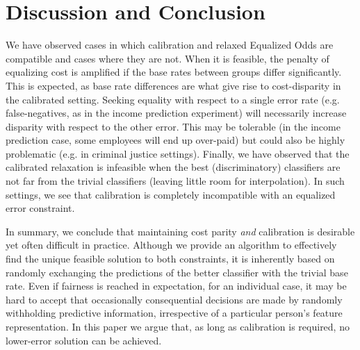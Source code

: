 \section{Discussion and Conclusion}

  We have observed cases in which calibration and relaxed Equalized Odds
  are compatible and cases where they
  are not. When it is feasible, the penalty of equalizing cost is amplified if
  the base rates between groups differ significantly. This is expected,
  as base rate differences are what give rise to cost-disparity in the calibrated setting.
  Seeking equality with respect to a single error rate (e.g. false-negatives, as in the income
  prediction experiment) will necessarily increase disparity with respect to the
  other error. This may be tolerable (in the income prediction case, some
  employees will end up over-paid) but could also be highly problematic (e.g.
  in criminal justice settings).
%
%
  Finally, we have observed that the calibrated relaxation is infeasible when the best (discriminatory)
  classifiers are not far from the trivial classifiers (leaving little room for interpolation). In such settings,
  we see that calibration is completely incompatible with an equalized error
  constraint.

In summary, we conclude that maintaining cost parity \emph{and} calibration is
desirable yet often difficult in practice. Although we provide an algorithm to
effectively find the unique feasible solution to both constraints, it is
inherently based on randomly exchanging the predictions of the better
classifier with the trivial base rate. Even if fairness is reached in
expectation, for an individual case, it may be hard  to accept that
occasionally consequential decisions are made by randomly withholding
predictive information, irrespective of a particular person's feature representation. In this
paper we argue that, as long as calibration is required, no lower-error solution can be achieved.




